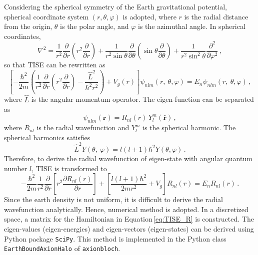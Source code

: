 Considering the spherical symmetry of the Earth gravitational potential, spherical coordinate system $(r, \theta, \varphi)$ is adopted, where $r$ is the radial distance from the origin, $\theta$ is the polar angle, and $\varphi$ is the azimuthal angle.
In spherical coordinates,
\begin{equation}
    \nabla^2 = \frac{1}{{r}^2}\frac{\partial}{\partial r}\left(r^2\frac{\partial}{\partial r}\right)+\frac{1}{r^2\sin\theta}\frac{\partial}{\partial \theta}\left(\sin\theta\frac{\partial}{\partial \theta}\right)+\frac{1}{r^2\sin^2\theta}\frac{\partial^2}{\partial \varphi^2}
    \,,\label{eq:laplacian_spherical}
\end{equation}
so that TISE can be rewritten as
\begin{equation}
    \left[-\frac{\hbar^2}{2m}\left(\frac{1}{{r}^2}\frac{\partial}{\partial r}\left(r^2\frac{\partial}{\partial r}\right)-\frac{{\hat{L}}^2}{\hbar^2r^2}\right)+V_g(r)\right]\psi_{nlm}\left(r,\ \theta,\varphi\right)=E_{n}\psi_{nlm}\left(r,\ \theta,\varphi\right)\,,
\end{equation}
where $\hat{L}$ is the angular momentum operator.
The eigen-function can be separated as
\begin{equation}
    \psi_{nlm}(\mathbf{r}) = R_{nl}(r)\,Y_l^m(\hat{\mathbf{r}})
    \,,\label{eq:psi_R_Y}
\end{equation}
where $R_{nl}$ is the radial wavefunction and $Y_l^m$ is the spherical harmonic.
The spherical harmonics satisfies
\begin{equation}
    {\hat{L}}^2Y\left(\theta,\ \varphi\right)=l\left(l+1\right)\hbar^2Y\left(\theta,\varphi\right)\,.
\end{equation}
Therefore, to derive the radial wavefunction of eigen-state with angular quantum number $l$, TISE is transformed to
\begin{equation}
    -\frac{\hbar^2}{2m}\frac{1}{{r}^2}\frac{\partial}{\partial r}\left[r^2\frac{\partial R_{nl}\left(r\right)}{\partial r}\right]+\left[\frac{l\left(l+1\right)\hbar^2}{2mr^2}+V_g\right]R_{nl}\left(r\right)=E_{n}R_{nl}\left(r\right)\,.
    \label{eq:TISE_R}
\end{equation}
Since the earth density is not uniform, it is difficult to derive the radial wavefunction analytically.
Hence, numerical method is adopted.
In a discretized space, a matrix for the Hamiltonian in Equation\,\eqref{eq:TISE_R} is constructed.
The eigen-values (eigen-energies) and eigen-vectors (eigen-states) can be derived using Python package \texttt{SciPy}.
This method is implemented in the Python class \texttt{EarthBoundAxionHalo} of \texttt{axionbloch}.

